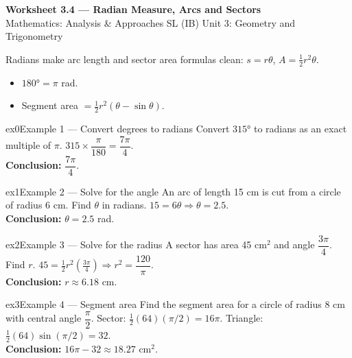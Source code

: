 \documentclass[11pt]{article}
\begin{document}
\begin{center}
{\LARGE\bfseries\color{titleblue}Worksheet 3.4 --- Radian Measure, Arcs and Sectors}\\[2pt]
{\small Mathematics: Analysis \& Approaches SL (IB) \textperiodcentered{} Unit 3: Geometry and Trigonometry}
\end{center}

\begin{ideabox}
Radians make arc length and sector area formulas clean: $s=r\theta$, $A=\tfrac12r^2\theta$.
\begin{itemize}[leftmargin=*,itemsep=2pt]
  \item $180°=\pi$ rad.
  \item Segment area $=\tfrac12r^2(\theta-\sin\theta)$.
\end{itemize}
\end{ideabox}


\begin{example}{ex0}{Example 1 --- Convert degrees to radians}
Convert $315°$ to radians as an exact multiple of $\pi$.\soln
$315\times\dfrac{\pi}{180}=\dfrac{7\pi}{4}$.\\[3pt]\textbf{Conclusion:} $\dfrac{7\pi}{4}$.
\end{example}

\begin{example}{ex1}{Example 2 --- Solve for the angle}
An arc of length 15 cm is cut from a circle of radius 6 cm. Find $\theta$ in radians.\soln
$15=6\theta\Rightarrow\theta=2.5$.\\[3pt]\textbf{Conclusion:} $\theta=2.5$ rad.
\end{example}

\begin{example}{ex2}{Example 3 --- Solve for the radius}
A sector has area 45 cm$^2$ and angle $\dfrac{3\pi}{4}$. Find $r$.\soln
$45=\tfrac12r^2\left(\tfrac{3\pi}4\right)\Rightarrow r^2=\dfrac{120}{\pi}$.\\[3pt]\textbf{Conclusion:} $r\approx6.18$ cm.
\end{example}

\begin{example}{ex3}{Example 4 --- Segment area}
Find the segment area for a circle of radius 8 cm with central angle $\dfrac{\pi}{2}$.\soln
Sector: $\tfrac12(64)(\pi/2)=16\pi$. Triangle: $\tfrac12(64)\sin(\pi/2)=32$.\\[3pt]\textbf{Conclusion:} $16\pi-32\approx18.27\text{ cm}^2$.
\end{example}
\end{document}
